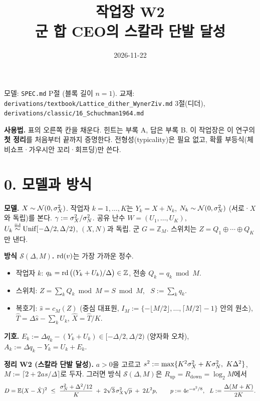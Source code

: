 
\title{\sffamily 작업장 W2\\[2pt]\large 군 합 CEO의 스칼라 단발 달성}
\author{}
\date{2026-11-22}

\maketitle
\vspace{-2.5em}
\begin{center}\small
모델: \texttt{SPEC.md} P절 (블록 길이 $n=1$). 교재: \texttt{derivations/textbook/Lattice\_dither\_WynerZiv.md} 3절(디더), \texttt{derivations/classic/16\_Schuchman1964.md}
\end{center}

\textbf{사용법.} 표의 오른쪽 칸을 채운다. 힌트는 부록 A, 답은 부록 B. 이 작업장은 이 연구의 \textbf{첫 정리}를 처음부터 끝까지 증명한다. 전형성(typicality)은 필요 없고, 확률 부등식(체비쇼프·가우시안 꼬리·회프딩)만 쓴다.

\section*{0. 모델과 방식}

\textbf{모델.} $X\sim\mathcal N(0,\sigma_X^2)$. 작업자 $k=1,\dots,K$는 $Y_k=X+N_k$, $N_k\sim\mathcal N(0,\sigma_N^2)$ (서로·$X$와 독립)를 본다. $\gamma:=\sigma_X^2/\sigma_N^2$. 공유 난수 $W=(U_1,\dots,U_K)$, $U_k\stackrel{\text{iid}}{\sim}\operatorname{Unif}[-\Delta/2,\Delta/2)$, $(X,N)$과 독립. 군 $G=\mathbb Z_M$. 스위치는 $Z=Q_1\oplus\cdots\oplus Q_K$만 낸다.

\textbf{방식 $\mathcal S(\Delta,M)$.} $\operatorname{rd}(v)$는 가장 가까운 정수.
\begin{itemize}[leftmargin=1.5em]
\item 작업자 $k$: $q_k=\operatorname{rd}\big((Y_k+U_k)/\Delta\big)\in\mathbb Z$, 전송 $Q_k=q_k \bmod M$.
\item 스위치: $Z=\sum_kQ_k \bmod M = S\bmod M$, \ $S:=\sum_k q_k$.
\item 복호기: $\hat s=c_M(Z)$ (중심 대표원, $I_M:=\{-\lfloor M/2\rfloor,\dots,\lceil M/2\rceil-1\}$ 안의 원소), $\hat T=\Delta\hat s-\sum_kU_k$, $\hat X=\hat T/K$.
\end{itemize}
\textbf{기호.} $E_k:=\Delta q_k-(Y_k+U_k)\in[-\Delta/2,\Delta/2)$ (양자화 오차), \ $A_k:=\Delta q_k-Y_k=U_k+E_k$.

\begin{thmbox}
\textbf{정리 W2 (스칼라 단발 달성).} $a>0$을 고르고 $s^2:=\max\{K^2\sX+K\sN,\ K\Delta^2\}$, $M:=\lceil 2+2as/\Delta\rceil$로 두자. 그러면 방식 $\mathcal S(\Delta,M)$은 $R_{\mathrm{up}}=R_{\mathrm{down}}=\log_2M$에서
\[
D=\E(X-\hat X)^2\ \le\ \frac{\sN+\Delta^2/12}{K}\;+\;2\sqrt3\,\sX\sqrt p\;+\;2L^2p,
\qquad p:=4e^{-a^2/8},\ \ L:=\frac{\Delta(M+K)}{2K}.
\]
\end{thmbox}

